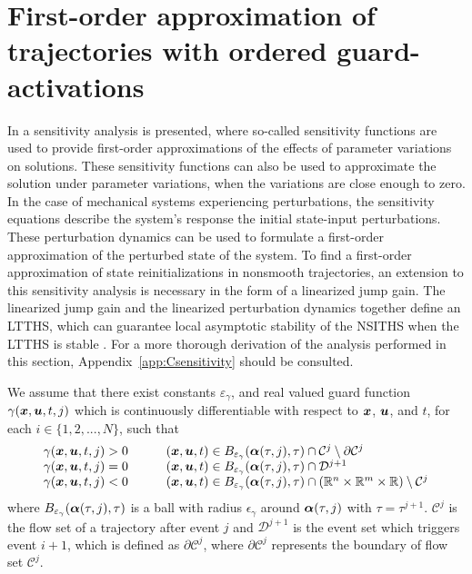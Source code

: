 \documentclass[../DC2017114Bouma.tex]{subfiles}
\begin{document}
\section{First-order approximation of trajectories with ordered guard-activations}
In \cite{Khalil1996} a sensitivity analysis is presented, where so-called sensitivity functions are used to provide first-order approximations of the effects of parameter variations on solutions. These sensitivity functions can also be used to approximate the solution under parameter variations, when the variations are close enough to zero. In the case of mechanical systems experiencing perturbations, the sensitivity equations describe the system's response the initial state-input perturbations. These perturbation dynamics can be used to formulate a first-order approximation of the perturbed state of the system. To find a first-order approximation of state reinitializations in nonsmooth trajectories, an extension to this sensitivity analysis is necessary in the form of a linearized jump gain. The linearized jump gain and the linearized perturbation dynamics together define an LTTHS, which can guarantee local asymptotic stability of the NSITHS when the LTTHS is stable \cite{Rijnen2017}. For a more thorough derivation of the analysis performed in this section, Appendix~\ref{app:Csensitivity} should be consulted.

\begin{myass}\label{ass:existence}
We assume that there exist constants $\varepsilon_\gamma$, and real valued guard function $\gamma({\boldsymbol{x}},{\boldsymbol{u}},t,j)$ which is continuously differentiable with respect to ${\boldsymbol{x}}$, ${\boldsymbol{u}}$, and $t$, for each $i\in \{1,2,...,N\}$, such that
\begin{equation}
\begin{array}{llll}
\gamma({\boldsymbol{x}},{\boldsymbol{u}},t,j) > 0 & &	&({\boldsymbol{x}},{\boldsymbol{u}},t) \in B_{\varepsilon_\gamma}(\boldsymbol{\alpha}(\tau,j),\tau)\cap \mathcal{C}^j\setminus\partial \mathcal{C}^j\\
\gamma({\boldsymbol{x}},{\boldsymbol{u}},t,j) = 0 & &	&({\boldsymbol{x}},{\boldsymbol{u}},t) \in B_{\varepsilon_\gamma}(\boldsymbol{\alpha}(\tau,j),\tau)\cap \mathcal{D}^{j+1}\\
\gamma({\boldsymbol{x}},{\boldsymbol{u}},t,j) < 0 & &	&({\boldsymbol{x}},{\boldsymbol{u}},t) \in B_{\varepsilon_\gamma}(\boldsymbol{\alpha}(\tau,j),\tau)\cap (\mathbb{R}^n \times \mathbb{R}^m \times \mathbb{R})\setminus \mathcal{C}^j
\end{array}
\end{equation}
where $B_{\varepsilon_{\gamma}}(\boldsymbol{\alpha}(\tau,j),\tau)$ is a ball with radius $\epsilon_{\gamma}$ around $\boldsymbol{\alpha}(\tau,j)$ with $\tau = \tau^{j+1}$. $\mathcal{C}^j$ is the flow set of a trajectory after event $j$ and $\mathcal{D}^{j+1}$ is the event set which triggers event $i+1$, which is defined as $\partial \mathcal{C}^j$, where $\partial \mathcal{C}^j$ represents the boundary of flow set $\mathcal{C}^j$.
\end{myass}
\end{document}
